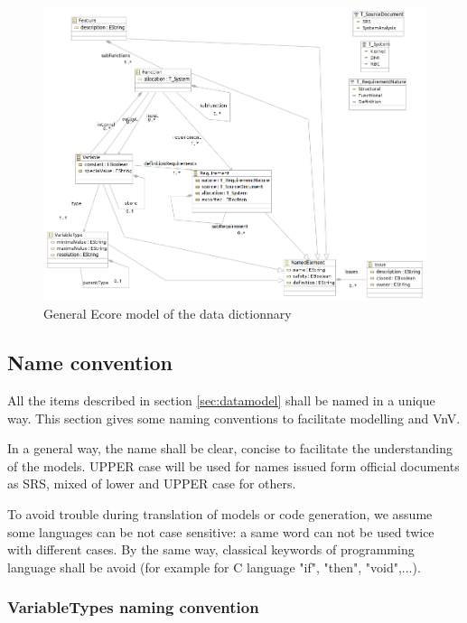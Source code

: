 \begin{figure}[ht]
  \centering
  \includegraphics[width=\textwidth]{DataModel/datadictionary.png}
  \caption{General Ecore model of the data dictionnary}
  \label{fig:links}
\end{figure}

\subsection{Name convention}
\label{sec:naming}


All the items described in section \ref{sec:datamodel} shall be named in a unique way. 
This section gives some naming conventions to facilitate modelling and VnV.

In a general way, the name shall be clear, concise to facilitate the understanding of the models. UPPER case will be used for names issued form official documents as SRS, mixed of lower and UPPER case for others.

To avoid trouble during translation of models or code generation, we assume some languages can be not case sensitive: a same word can not be used twice with different cases. By the same way, classical keywords of programming language shall be avoid (for example for C language "if", "then", "void",...).




\subsubsection{VariableTypes naming convention}

